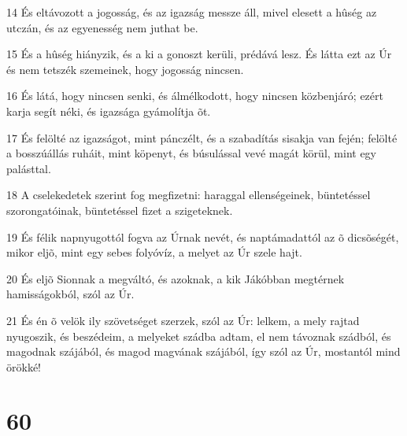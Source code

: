 \par 14 És eltávozott a jogosság, és az igazság messze áll, mivel elesett a hûség az utczán, és az egyenesség nem juthat be.
\par 15 És a hûség hiányzik, és a ki a gonoszt kerüli, prédává lesz. És látta ezt az Úr és nem tetszék szemeinek, hogy jogosság nincsen.
\par 16 És látá, hogy nincsen senki, és álmélkodott, hogy nincsen közbenjáró; ezért karja segít néki, és igazsága gyámolítja õt.
\par 17 És felölté az igazságot, mint pánczélt, és a szabadítás sisakja van fején; felölté a bosszúállás ruháit, mint köpenyt, és búsulással vevé magát körül, mint egy palásttal.
\par 18 A cselekedetek szerint fog megfizetni: haraggal ellenségeinek, büntetéssel szorongatóinak, büntetéssel fizet a szigeteknek.
\par 19 És félik napnyugottól fogva az Úrnak nevét, és naptámadattól az õ dicsõségét, mikor eljõ, mint egy sebes folyóvíz, a melyet az Úr szele hajt.
\par 20 És eljõ Sionnak a megváltó, és azoknak, a kik Jákóbban megtérnek hamisságokból, szól az Úr.
\par 21 És én õ velök ily szövetséget szerzek, szól az Úr: lelkem, a mely rajtad nyugoszik, és beszédeim, a melyeket szádba adtam, el nem távoznak szádból, és magodnak szájából, és magod magvának szájából, így szól az Úr, mostantól mind örökké!

\chapter{60}

